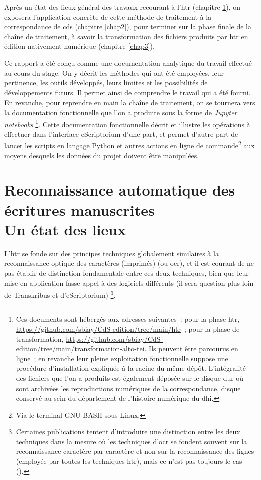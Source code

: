 \documentclass[a4paper,12pt,twoside]{book}
\begin{document}
			Après un état des lieux général des travaux recourant à l'\gls{htr} (chapitre \ref{chap1}), on exposera l'application concrète de cette méthode de traitement à la correspondance de \gls{cds} (chapitre \ref{chap2}), pour terminer sur la phase finale de la chaîne de traitement, à savoir la transformation des fichiers produits par \gls{htr} en édition nativement numérique (chapitre \ref{chap3}).
			
			Ce rapport a été conçu comme une documentation analytique du travail effectué au cours du stage. On y décrit les méthodes qui ont été employées, leur pertinence, les outils développés, leurs limites et les possibilités de développements futurs. Il permet ainsi de comprendre le travail qui a été fourni. En revanche, pour reprendre en main la chaîne de traitement, on se tournera vers la documentation fonctionnelle que l'on a produite sous la forme de \textit{Jupyter notebooks}%
			\footnote{%
				Ces documents sont hébergés aux adresses suivantes~: pour la phase \gls{htr}, \url{https://github.com/sbiay/CdS-edition/tree/main/htr}~; pour la phase de transformation, \url{https://github.com/sbiay/CdS-edition/tree/main/transformation-alto-tei}. Ils peuvent être parcourus en ligne~; en revanche leur pleine exploitation fonctionnelle suppose une procédure d'installation expliquée à la racine du même dépôt. L'intégralité des fichiers que l'on a produits est également déposée sur le disque dur où sont archivées les reproductions numériques de la correspondance, disque conservé au sein du département de l'histoire numérique du \gls{dhi}.%
			}.
			Cette documentation fonctionnelle décrit et illustre les opérations à effectuer dans l'interface eScriptorium d'une part, et permet d'autre part de lancer les scripts en langage Python et autres actions en ligne de commande\footnote{Via le terminal GNU BASH sous Linux.} aux moyens desquels les données du projet doivent être manipulées.
							
	\chapter[HTR~: état des lieux]{Reconnaissance automatique des écritures manuscrites \\ \large Un état des lieux}
		\label{chap1}
		
		L'\gls{htr} se fonde sur des principes techniques globalement similaires à la reconnaissance optique des caractères (imprimés) (ou \gls{ocr}), et il est courant de ne pas établir de distinction fondamentale entre ces deux techniques, bien que leur mise en application fasse appel à des logiciels différents (il sera question plus loin de Transkribus et d'eScriptorium)
		\footnote{
			Certaines publications tentent d'introduire une distinction entre les deux techniques dans la mesure où les techniques d'\gls{ocr} se fondent souvent sur la reconnaissance caractère par caractère et non sur la reconnaissance des lignes (employée par toutes les techniques \gls{htr}), mais ce n'est pas toujours le cas (\cite{stokesEScriptoriumVREManuscript2021}).
			}.
		
\end{document}
